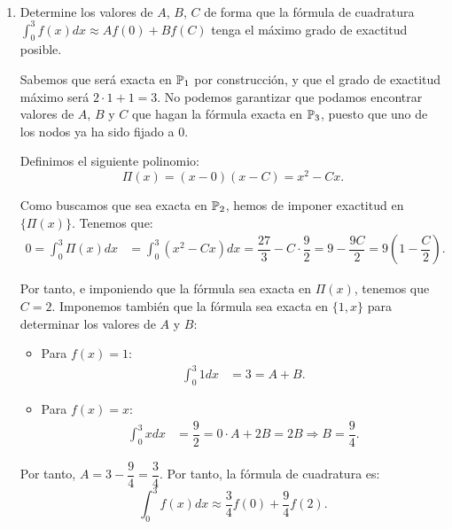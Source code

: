 \begin{ejercicio}\label{ej:2.1.26}~
    \begin{enumerate}
        \item Determine los valores de $A$, $B$, $C$ de forma que la fórmula de cuadratura $\int_{0}^{3} f(x) dx \approx Af(0) + Bf(C)$ tenga el máximo grado de exactitud posible.
        
        Sabemos que será exacta en $\mathbb{P}_1$ por construcción, y que el grado de exactitud máximo será $2\cdot 1 + 1 = 3$. No podemos garantizar que podamos encontrar valores de $A$, $B$ y $C$ que hagan la fórmula exacta en $\mathbb{P}_3$, puesto que uno de los nodos ya ha sido fijado a $0$.

        Definimos el siguiente polinomio:
        \begin{equation*}
            \Pi(x) = (x-0)(x-C) = x^2 - Cx.
        \end{equation*}

        Como buscamos que sea exacta en $\mathbb{P}_2$, hemos de imponer exactitud en $\{\Pi(x)\}$. Tenemos que:
        \begin{align*}
            0 = \int_{0}^{3} \Pi(x) dx &= \int_{0}^{3} (x^2 - Cx) dx = \dfrac{27}{3} - C\cdot \dfrac{9}{2} = 9 - \dfrac{9C}{2}
            = 9\left(1 - \dfrac{C}{2}\right).
        \end{align*}

        Por tanto, e imponiendo que la fórmula sea exacta en $\Pi(x)$, tenemos que $C=2$. Imponemos también que la fórmula sea exacta en $\{1,x\}$ para determinar los valores de $A$ y $B$:
        \begin{itemize}
            \item Para $f(x) = 1$:
            \begin{align*}
                \int_{0}^{3} 1 dx &= 3 = A + B.
            \end{align*}
            \item Para $f(x) = x$:
            \begin{align*}
                \int_{0}^{3} x dx &= \dfrac{9}{2} = 0\cdot A + 2B = 2B \Longrightarrow B = \dfrac{9}{4}.
            \end{align*}
        \end{itemize}

        Por tanto, $A = 3 - \dfrac{9}{4} = \dfrac{3}{4}$. Por tanto, la fórmula de cuadratura es:
        \begin{equation*}
            \int_{0}^{3} f(x) dx \approx \dfrac{3}{4}f(0) + \dfrac{9}{4}f(2).
        \end{equation*}


\end{enumerate}
\end{ejercicio}

